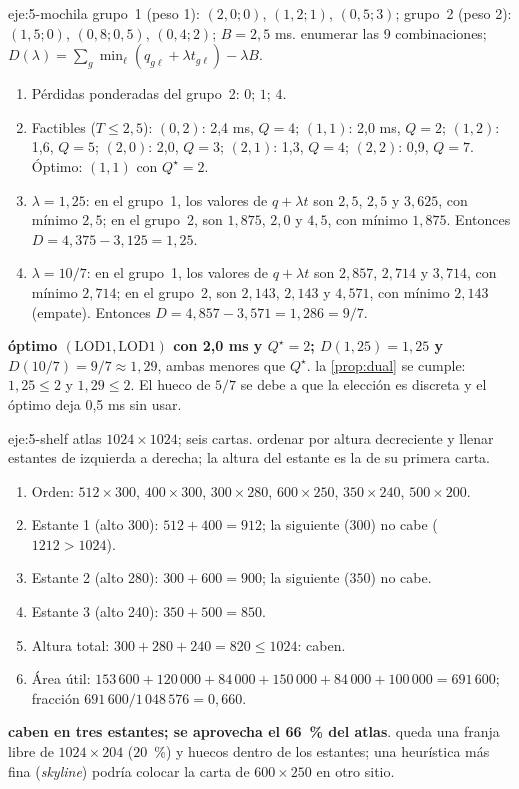 \begin{solucion}{eje:5-mochila}
\datos grupo~1 (peso 1): $(2{,}0;0)$, $(1{,}2;1)$, $(0{,}5;3)$; grupo~2 (peso 2): $(1{,}5;0)$, $(0{,}8;0{,}5)$, $(0{,}4;2)$; $B=2{,}5$ ms.
\planteamiento enumerar las 9 combinaciones; $D(\lambda)=\sum_g\min_\ell(q_{g\ell}+\lambda t_{g\ell})-\lambda B$.
\pasos
\begin{enumerate}[label=\arabic*.]
  \item Pérdidas ponderadas del grupo~2: $0$; $1$; $4$.
  \item Factibles ($T\le 2{,}5$): $(0,2)$: 2,4 ms, $Q=4$; $(1,1)$: 2,0 ms, $Q=2$; $(1,2)$: 1,6, $Q=5$; $(2,0)$: 2,0, $Q=3$; $(2,1)$: 1,3, $Q=4$; $(2,2)$: 0,9, $Q=7$. Óptimo: $(1,1)$ con $Q^\star=2$.
  \item $\lambda=1{,}25$: en el grupo~1, los valores de $q+\lambda t$ son $2{,}5$, $2{,}5$ y $3{,}625$, con mínimo $2{,}5$; en el grupo~2, son $1{,}875$, $2{,}0$ y $4{,}5$, con mínimo $1{,}875$. Entonces $D=4{,}375-3{,}125=1{,}25$.
  \item $\lambda=10/7$: en el grupo~1, los valores de $q+\lambda t$ son $2{,}857$, $2{,}714$ y $3{,}714$, con mínimo $2{,}714$; en el grupo~2, son $2{,}143$, $2{,}143$ y $4{,}571$, con mínimo $2{,}143$ (empate). Entonces $D=4{,}857-3{,}571=1{,}286=9/7$.
\end{enumerate}
\resultado \textbf{óptimo $(\text{LOD1},\text{LOD1})$ con 2,0 ms y $Q^\star=2$; $D(1{,}25)=1{,}25$ y $D(10/7)=9/7\approx 1{,}29$}, ambas menores que $Q^\star$.
\comprobacion la \cref{prop:dual} se cumple: $1{,}25\le 2$ y $1{,}29\le 2$. El hueco de $5/7$ se debe a que la elección es discreta y el óptimo deja 0,5 ms sin usar.
\end{solucion}

\begin{solucion}{eje:5-shelf}
\datos atlas $1024\times 1024$; seis cartas.
\planteamiento ordenar por altura decreciente y llenar estantes de izquierda a derecha; la altura del estante es la de su primera carta.
\pasos
\begin{enumerate}[label=\arabic*.]
  \item Orden: $512\times 300$, $400\times 300$, $300\times 280$, $600\times 250$, $350\times 240$, $500\times 200$.
  \item Estante 1 (alto 300): $512+400=912$; la siguiente ($300$) no cabe ($1212>1024$).
  \item Estante 2 (alto 280): $300+600=900$; la siguiente ($350$) no cabe.
  \item Estante 3 (alto 240): $350+500=850$.
  \item Altura total: $300+280+240=820\le 1024$: caben.
  \item Área útil: $153\,600+120\,000+84\,000+150\,000+84\,000+100\,000=691\,600$; fracción $691\,600/1\,048\,576=0{,}660$.
\end{enumerate}
\resultado \textbf{caben en tres estantes; se aprovecha el 66~\% del atlas}.
\comprobacion queda una franja libre de $1024\times 204$ ($20$~\%) y huecos dentro de los estantes; una heurística más fina (\emph{skyline}) podría colocar la carta de $600\times 250$ en otro sitio.
\end{solucion}

